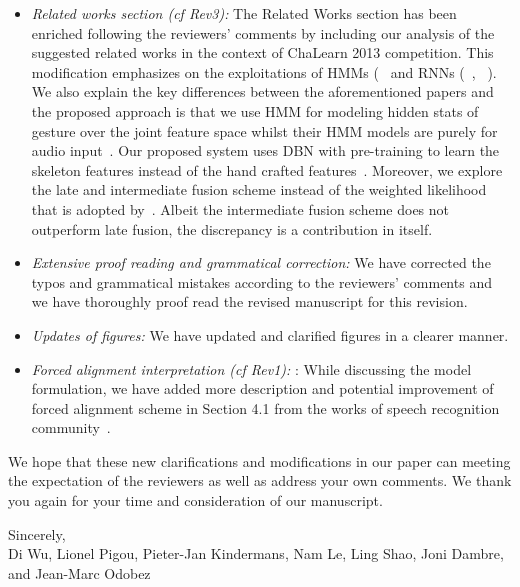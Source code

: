 \documentclass[12pt]{article}
\begin{document}
\begin{itemize}
\item {\em Related works section (cf Rev3):} The Related Works section has been enriched following the reviewers' comments by  including our analysis of the suggested related works in the context of ChaLearn 2013 competition. This modification emphasizes on the exploitations of HMMs (~\cite{nandakumar2013multi, wu2013fusing} and RNNs (~\cite{neverova2013multi}, ~\cite{wu2013fusing, socher2012convolutional}). 
%
We also explain the key differences between the aforementioned papers and the proposed approach is that we use HMM for modeling hidden stats of gesture over the joint feature space whilst their HMM models are purely for audio input~\cite{nandakumar2013multi,wu2013fusing}.
%
Our proposed system uses DBN with pre-training to learn the skeleton features instead of the hand crafted features~\cite{neverova2013multi}. Moreover, we explore the late and intermediate fusion scheme instead of the weighted likelihood that is adopted by~\cite{nandakumar2013multi}.
%
Albeit the intermediate fusion scheme does not outperform late fusion, the discrepancy is a contribution in itself.

\item {\em Extensive proof reading and grammatical correction:} We have corrected the typos and grammatical mistakes according to the reviewers' comments and we have thoroughly proof read the revised manuscript for this revision.

\item {\em Updates of figures:} We have updated and clarified figures in a clearer manner.
%
 \item {\em Forced alignment interpretation (cf Rev1): }: While discussing the model formulation, we have added more description and potential improvement of forced alignment scheme in Section 4.1 from the works of speech recognition community~\cite{yu2012automatic}.

\end{itemize}
We hope that these new clarifications and modifications in our paper can meeting the expectation of the reviewers as well as address your own comments. We thank you again for your time and consideration of our manuscript.

\noindent Sincerely,\\[3mm]
Di Wu, Lionel Pigou, Pieter-Jan Kindermans, Nam Le, Ling Shao, Joni Dambre, and Jean-Marc Odobez



\end{document}

